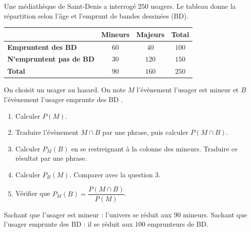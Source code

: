\documentclass[10pt,a4paper]{article}
\begin{document}
\begin{bloc}
\begin{exo}[Guidé]
Une médiathèque de Saint-Denis a interrogé \(250\) usagers. Le tableau donne la répartition selon l'âge et l'emprunt de bandes dessinées (BD).

\begin{center}
\renewcommand{\arraystretch}{1.5}
\begin{tabular}{|l|c|c|c|}
    \hline
    & \textbf{Mineurs} & \textbf{Majeurs} & \textbf{Total} \\ \hline
    \textbf{Empruntent des BD} & \(60\) & \(40\) & \(100\) \\ \hline
    \textbf{N'empruntent pas de BD} & \(30\) & \(120\) & \(150\) \\ \hline
    \textbf{Total} & \(90\) & \(160\) & \(250\) \\ \hline
\end{tabular}
\end{center}

On choisit un usager au hasard. On note \(M\) l'évènement \og l'usager est mineur \fg{} et \(B\) l'évènement \og l'usager emprunte des BD \fg{}.
\begin{enumerate}[leftmargin=*]
    \item Calculer \(P(M)\).
    \item Traduire l'évènement \(M\cap B\) par une phrase, puis calculer \(P(M\cap B)\).
    \item Calculer \(P_M(B)\) en se restreignant à la colonne des mineurs. Traduire ce résultat par une phrase.
    \item Calculer \(P_B(M)\). Comparer avec la question 3.
    \item Vérifier que \(P_M(B)=\dfrac{P(M\cap B)}{P(M)}\).
\end{enumerate}

\begin{indication}
\og Sachant que l'usager est mineur \fg{} : l'univers se réduit aux \(90\) mineurs. \og Sachant que l'usager emprunte des BD \fg{} : il se réduit aux \(100\) emprunteurs de BD.
\end{indication}

\end{exo}
\end{bloc}
\end{document}
